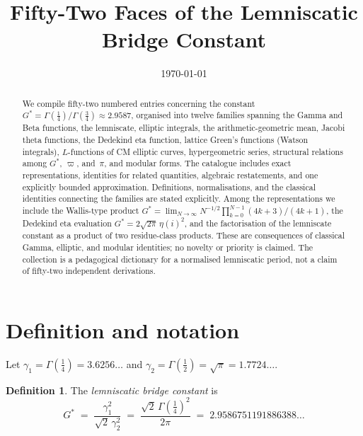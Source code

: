\documentclass[12pt,reqno]{amsart}
\title{Fifty-Two Faces of the Lemniscatic Bridge Constant}
\author{}
\date{\today}
\theoremstyle{definition}
\newtheorem{definition}[theorem]{Definition}
\theoremstyle{remark}
\newcommand{\Gstar}{G^{\!*}}
\newcommand{\varpiup}{\varpi}
\begin{document}
\raggedbottom
\allowdisplaybreaks[1]

\begin{abstract}
We compile fifty-two numbered entries concerning the constant
${\Gstar} = \Gamma(\tfrac14)/\Gamma(\tfrac34) \approx 2.9587$,
organised into twelve families spanning the Gamma and Beta functions,
the lemniscate, elliptic integrals, the arithmetic-geometric mean,
Jacobi theta functions, the Dedekind eta function, lattice Green's
functions (Watson integrals), $L$-functions of CM elliptic curves,
hypergeometric series, structural relations among
$\Gstar$, $\varpiup$, and~$\pi$, and modular forms.
The catalogue includes exact representations, identities for related
quantities, algebraic restatements, and one explicitly bounded approximation.
Definitions, normalisations, and the classical identities connecting the
families are stated explicitly.
Among the representations we include the Wallis-type product
$\Gstar = \lim_{N\to\infty} N^{-1/2}\prod_{k=0}^{N-1}(4k+3)/(4k+1)$,
the Dedekind eta evaluation $\Gstar = 2\sqrt{2\pi}\,\eta(i)^{2}$,
and the factorisation of the lemniscate constant as a product
of two residue-class products. These are consequences of classical Gamma,
elliptic, and modular identities; no novelty or priority is claimed.
The collection is a pedagogical dictionary for a normalised lemniscatic
period, not a claim of fifty-two independent derivations.
\end{abstract}

\maketitle


\section{Definition and notation}\label{sec:def}

Let $\gamma_{1}=\Gamma(\tfrac14)=3.6256\ldots$ and
$\gamma_{2}=\Gamma(\tfrac12)=\sqrt{\pi}=1.7724\ldots$.

\begin{definition}\label{def:Gstar}
The \emph{lemniscatic bridge constant} is
\begin{equation}\label{eq:def}
  {\Gstar} \;=\; \frac{\gamma_{1}^{2}}{\sqrt{2}\,\gamma_{2}^{2}}
  \;=\; \frac{\sqrt{2}\,\Gamma(\tfrac14)^{2}}{2\pi}
  \;=\; 2.9586751191886388\ldots
\end{equation}
\end{definition}
\end{document}
